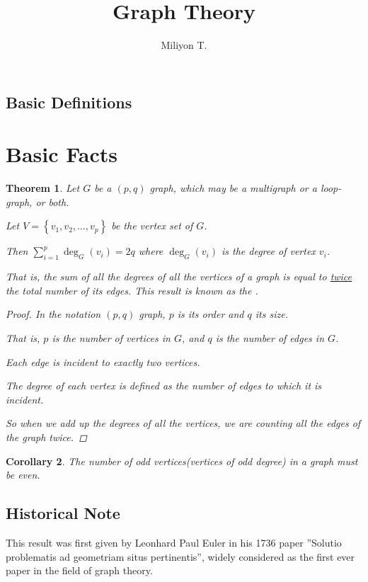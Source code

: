 \documentclass{article}
\newtheorem{thm}{Theorem}[section]
\newtheorem{cor}[thm]{Corollary}
\theoremstyle{definition}
\begin{document}
\title{\textbf{Graph Theory}}
\author{Miliyon T.}
\maketitle
\subsection*{Basic Definitions}

\section{Basic Facts}
\begin{thm}
Let $G$ be a $\left({p, q}\right)$ graph, which may be a multigraph or a loop-graph, or both.

Let $V = \left\{{v_1, v_2, \ldots, v_p}\right\}$ be the vertex set  of $G$.


Then $\displaystyle \sum_{i \mathop = 1}^p \deg_G \left({v_i}\right) = 2 q$
where $\deg_G \left({v_i}\right)$ is the degree of vertex $v_i$.


That is, the sum of all the degrees of all the vertices of a graph is equal to \underline{twice} the total number of its edges.
This result is known as the .

\begin{proof}
In the notation $\left({p, q}\right)$ graph, $p$ is its order and $q$ its size.

That is, $p$ is the number of vertices in $G$, and $q$ is the number of edges in $G$.

Each  edge is incident to exactly two vertices.

The degree of each vertex is defined as the number of edges to which it is incident.

So when we add up the degrees of all the vertices, we are counting all the edges of the graph twice.
\end{proof}
\end{thm}

\begin{cor}
The number of odd vertices(vertices of odd degree) in a graph must be  even.
\end{cor}


\subsection{Historical Note}
This result was first given by Leonhard Paul Euler in his 1736 paper ''Solutio problematis ad geometriam situs pertinentis'', widely considered as the first ever paper in the field of graph theory.
\end{document}
